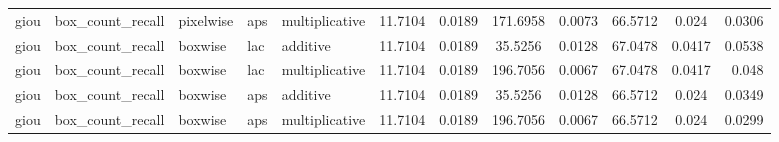 \begin{table*}[htbp]
\begin{tabular}{@{}lllll rrcrrcr@{}}
giou & box\_count\_recall & pixelwise & aps & multiplicative & 11.7104 & 0.0189 & 171.6958 & 0.0073 & 66.5712 & 0.024 & 0.0306 \\
giou & box\_count\_recall & boxwise & lac & additive & 11.7104 & 0.0189 & 35.5256 & 0.0128 & 67.0478 & 0.0417 & 0.0538 \\
giou & box\_count\_recall & boxwise & lac & multiplicative & 11.7104 & 0.0189 & 196.7056 & 0.0067 & 67.0478 & 0.0417 & 0.048 \\
giou & box\_count\_recall & boxwise & aps & additive & 11.7104 & 0.0189 & 35.5256 & 0.0128 & 66.5712 & 0.024 & 0.0349 \\
giou & box\_count\_recall & boxwise & aps & multiplicative & 11.7104 & 0.0189 & 196.7056 & 0.0067 & 66.5712 & 0.024 & 0.0299 \\
    \bottomrule
    \end{tabular}
    \end{table*}
    